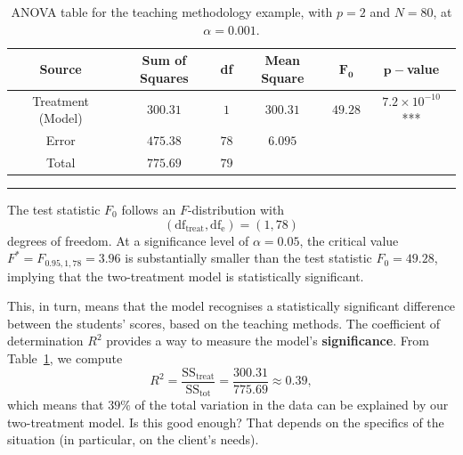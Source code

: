      \begin{table}[t]
         \centering
         \begin{tabular}{c c c c c c}
         \hline
        \textbf{Source} & \textbf{Sum of Squares} & \textbf{df} & \textbf{Mean Square} & $\mathbf{F_{0}}$ & $\mathbf{p-}$\textbf{value}\\
         \hline
         Treatment (Model) & $300.31$ & $1$ & $300.31$ & $49.28$ & $7.2\times 10^{-10}$ ***\\
         Error & $475.38$ & $78$ & $6.095$ & \\
         Total & $775.69$ & $79$ & & \\
        \hline
         \end{tabular}
         \caption[\small ANOVA table -- teaching methodology]{\small ANOVA table for the teaching methodology example, with $p=2$ and $N=80$, at $\alpha=0.001$.}
         \label{tab:SA3}\hrule
     \end{table}
The test statistic $F_{0}$ follows an $F$-distribution with $$(\text{df}_{\textrm{treat}}, \text{df}_{\textrm{e}})=(1,78)$$ degrees of freedom. At a significance level of $\alpha=0.05$, the critical value $F^*=F_{0.95, 1, 78}=3.96$ is substantially smaller than the test statistic $F_{0}=49.28$, implying that the two-treatment model is statistically significant. \par This, in turn, means that the model recognises a statistically significant difference between the students' scores, based on the teaching methods. 
\newl The coefficient of determination $R^2$ provides a way to measure the model's \textbf{significance}. From Table~\ref{tab:SA3}, we compute $$R^{2}=\frac{\text{SS}_{\textrm{treat}}}{\text{SS}_{\textrm{tot}}}=\frac{300.31}{775.69}\approx 0.39,$$ which means that $39\%$ of the total variation in the data can be explained by our two-treatment model. Is this good enough? That depends on the specifics of the situation (in particular, on the client's needs).
